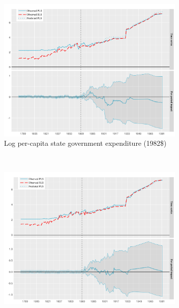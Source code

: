 \documentclass[12pt]{article}
\begin{document}
{\begin{figure}[htbp]
	\centering
	\begin{subfigure}[t]{0.8\textwidth}
		\centering
		\includegraphics[width=\textwidth]{plots/mc-exp-pc.png}
		\caption{Log per-capita state government expenditure (1982\$)\label{mc-estimates-exp-pc}}
	\end{subfigure}
	~ 
	\begin{subfigure}[t]{0.8\textwidth}
		\centering
		\includegraphics[width=\textwidth]{plots/mc-rev-pc.png}

\end{subfigure}
\end{figure}}
\end{document}

